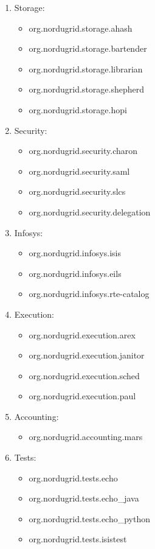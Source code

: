 \begin{enumerate}
\item Storage:
\begin{itemize}
\item org.nordugrid.storage.ahash
\item org.nordugrid.storage.bartender
\item org.nordugrid.storage.librarian
\item org.nordugrid.storage.shepherd
\item org.nordugrid.storage.hopi
\end{itemize}
\item Security:
\begin{itemize}
\item org.nordugrid.security.charon
\item org.nordugrid.security.saml
\item org.nordugrid.security.slcs
\item org.nordugrid.security.delegation
\end{itemize}
\item Infosys:
\begin{itemize}
\item org.nordugrid.infosys.isis
\item org.nordugrid.infosys.eils
\item org.nordugrid.infosys.rte-catalog
\end{itemize}
\item Execution:
\begin{itemize}
\item org.nordugrid.execution.arex
\item org.nordugrid.execution.janitor
\item org.nordugrid.execution.sched
\item org.nordugrid.execution.paul
\end{itemize}
\item Accounting:
\begin{itemize}
\item org.nordugrid.accounting.mars
\end{itemize}
\item Tests:
\begin{itemize}
\item org.nordugrid.tests.echo
\item org.nordugrid.tests.echo\_java
\item org.nordugrid.tests.echo\_python
\item org.nordugrid.tests.isistest
\end{itemize}
\end{enumerate}

